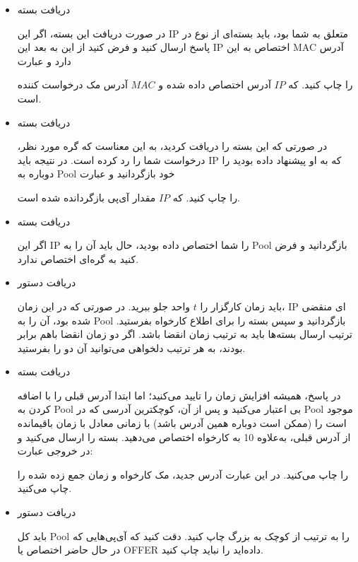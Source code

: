 \begin{itemize}
\item
دریافت بسته

در صورت دریافت این بسته، اگر این IP متعلق به شما بود، باید بسته‌ای از نوع 
در پاسخ ارسال کنید و فرض کنید از این به بعد این IP اختصاص به این MAC آدرس دارد و عبارت
\begin{flushleft}
\end{flushleft}
را چاپ کنید. که $IP$ آدرس اختصاص داده شده و $MAC$ آدرس مک درخواست کننده است.

\item
دریافت بسته 

در صورتی که این بسته را دریافت کردید، به این معناست که گره مورد نظر، درخواست شما را رد کرده است. در نتیجه باید IP که به او پیشنهاد داده بودید را دوباره به Pool خود بازگردانید و عبارت
\begin{flushleft}
\end{flushleft}
را چاپ کنید. که $IP$ مقدار آی‌پی بازگردانده شده است.

\item
دریافت بسته

اگر این IP را شما اختصاص داده بودید، حال باید آن را به Pool بازگردانید و فرض کنید به گره‌ای اختصاص ندارد.

\item
دریافت دستور
\begin{flushleft}
\end{flushleft}

باید زمان کارگزار را $t$ واحد جلو ببرید. در صورتی که در این زمان، IP ای منقضی شده بود، آن را به Pool بازگردانید و سپس بسته 
را برای اطلاع کارخواه بفرستید.
ترتیب ارسال بسته‌ها باید به ترتیب زمان انقضا باشد. اگر دو زمان انقضا باهم برابر بودند، به هر ترتیب دلخواهی می‌توانید آن دو را بفرستید.
\item
دریافت بسته 

در پاسخ، همیشه افزایش زمان را تایید می‌کنید؛ اما ابتدا آدرس قبلی را با اضافه کردن به Pool بی اعتبار می‌کنید و پس از آن، کوچکترین آدرسی که در Pool موجود است را (ممکن است دوباره همین آدرس باشد) با زمانی معادل با زمان باقیمانده از آدرس قبلی، به‌علاوه 10 به کارخواه اختصاص می‌دهید. بسته را ارسال می‌کنید و در خروجی عبارت:
\begin{flushleft}
\end{flushleft}
را چاپ می‌کنید. در این عبارت آدرس جدید، مک کارخواه و زمان جمع زده شده را چاپ می‌کنید.

\item
دریافت دستور
\begin{flushleft}
\end{flushleft}

باید کل Pool را به ترتیب از کوچک به بزرگ چاپ کنید. دقت کنید که آی‌پی‌‌هایی که  در حال حاضر اختصاص  یا OFFER داده‌اید را نباید چاپ کنید.

\end{itemize}
